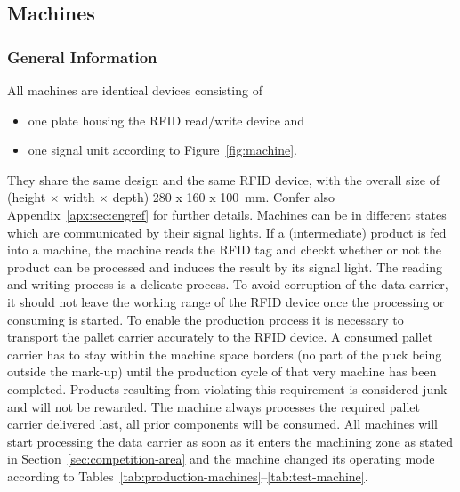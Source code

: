 \documentclass[12pt,twoside]{article}
\begin{document}
\subsection{Machines}
\label{sec:machines}

\subsubsection{General Information}


All machines are identical devices consisting of 
\begin{itemize}
\item one plate housing the RFID read/write device and
\item one signal unit according to Figure~\ref{fig:machine}.
\end{itemize}

They share the same design and the same RFID device, with the overall
size of (height $\times$ width $\times$ depth) \SI{280 x 160 x
100}{\milli\metre}. Confer also Appendix~\ref{apx:sec:engref} for further
details. Machines can be in different states which are communicated by their
signal lights. If a (intermediate) product is fed into a machine, the machine
reads the RFID tag and checkt whether or not the product can be processed and
induces the result by its signal light. The reading and writing process is a
delicate process. To avoid corruption of the data carrier, it should not leave
the working range of the RFID device once the processing or consuming is
started. To enable the production process it is necessary to transport the
pallet carrier accurately to the RFID device. A consumed pallet carrier has to
stay within the machine space borders (no part of the puck being outside the
mark-up) until the production cycle of that very machine has been completed.
Products resulting from violating this requirement is considered junk and will
not be rewarded. The machine always processes the required pallet carrier
delivered last, all prior components will be consumed. All machines will start
processing the data carrier as soon as it enters the machining zone as stated in
Section~\ref{sec:competition-area} and the machine changed its operating mode
according to Tables~\ref{tab:production-machines}--\ref{tab:test-machine}.
\end{document}
